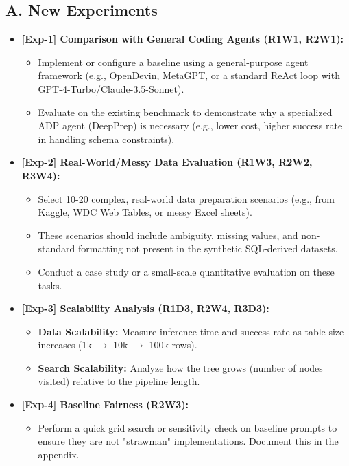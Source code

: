 \subsection*{A. New Experiments}
\begin{itemize}
    \item \textbf{[Exp-1] Comparison with General Coding Agents (R1W1, R2W1):} 
    \begin{itemize}
        \item Implement or configure a baseline using a general-purpose agent framework (e.g., OpenDevin, MetaGPT, or a standard ReAct loop with GPT-4-Turbo/Claude-3.5-Sonnet).
        \item Evaluate on the existing benchmark to demonstrate why a specialized ADP agent (DeepPrep) is necessary (e.g., lower cost, higher success rate in handling schema constraints).
    \end{itemize}
    
    \item \textbf{[Exp-2] Real-World/Messy Data Evaluation (R1W3, R2W2, R3W4):}
    \begin{itemize}
        \item Select 10-20 complex, real-world data preparation scenarios (e.g., from Kaggle, WDC Web Tables, or messy Excel sheets).
        \item These scenarios should include ambiguity, missing values, and non-standard formatting not present in the synthetic SQL-derived datasets.
        \item Conduct a case study or a small-scale quantitative evaluation on these tasks.
    \end{itemize}
    
    \item \textbf{[Exp-3] Scalability Analysis (R1D3, R2W4, R3D3):}
    \begin{itemize}
        \item \textbf{Data Scalability:} Measure inference time and success rate as table size increases (1k $\to$ 10k $\to$ 100k rows).
        \item \textbf{Search Scalability:} Analyze how the tree grows (number of nodes visited) relative to the pipeline length.
    \end{itemize}
    
    \item \textbf{[Exp-4] Baseline Fairness (R2W3):}
    \begin{itemize}
        \item Perform a quick grid search or sensitivity check on baseline prompts to ensure they are not "strawman" implementations. Document this in the appendix.
    \end{itemize}
\end{itemize}

